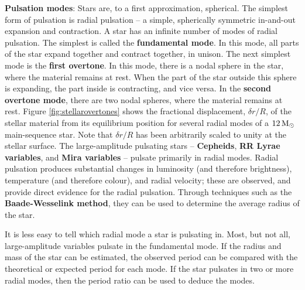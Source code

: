 \documentclass[a4paper,10pt]{article}
\begin{document}
{\noindent}\textbf{Pulsation modes}: Stars are, to a first approximation, spherical. The simplest form of pulsation is radial pulsation -- a simple, spherically symmetric in-and-out expansion and contraction. A star has an infinite number of modes of radial pulsation. The simplest is called the \textbf{fundamental mode}. In this mode, all parts of the star expand together and contract together, in unison. The next simplest mode is the \textbf{first overtone}. In this mode, there is a nodal sphere in the star, where the material remains at rest. When the part of the star outside this sphere is expanding, the part inside is contracting, and vice versa. In the \textbf{second overtone mode}, there are two nodal spheres, where the material remains at rest. Figure \ref{fig:stellarovertones} shows the fractional displacement, $\delta r/R$, of the stellar material from its equilibrium position for several radial modes of a $12\,{\rm M_\odot}$ main-sequence star. Note that $\delta r/R$ has been arbitrarily scaled to unity at the stellar surface. The large-amplitude pulsating stars -- \textbf{Cepheids}, \textbf{RR Lyrae variables}, and \textbf{Mira variables} -- pulsate primarily in radial modes. Radial pulsation produces substantial changes in luminosity (and therefore brightness), temperature (and therefore colour), and radial velocity; these are observed, and provide direct evidence for the radial pulsation. Through techniques such as the \textbf{Baade-Wesselink method}, they can be used to determine the average radius of the star.

{\noindent}It is less easy to tell which radial mode a star is pulsating in. Most, but not all, large-amplitude variables pulsate in the fundamental mode. If the radius and mass of the star can be estimated, the observed period can be compared with the theoretical or expected period for each mode. If the star pulsates in two or more radial modes, then the period ratio can be used to deduce the modes.
\end{document}
